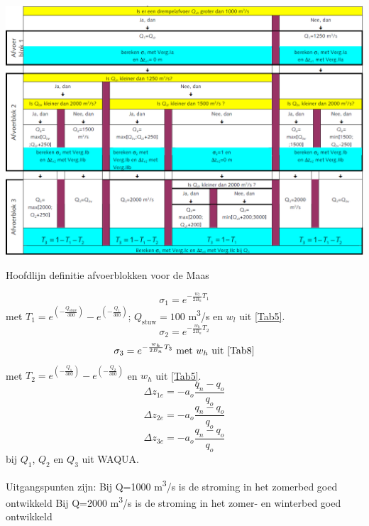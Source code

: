 \begin{table}
\includegraphics[width=\columnwidth]{figures/Tab8.png}
\caption{Hoofdlijn definitie afvoerblokken voor de Maas}
\label{Tab8}
\end{table}
%
\begin{equation}
\sigma_1 = e^{-\frac{w_l}{2 B_n} T_1}
\end{equation}
met $T_1 = e^{\left ( - \frac{Q_\text{stuw}}{300} \right )} - e^{\left ( - \frac{Q_1}{300} \right )}$; $Q_\text{stuw} = 100$ m\textsuperscript{3}/s en $w_l$ uit \autoref{Tab5}.
%
\begin{equation}
\sigma_2 = e^{-\frac{w_h}{2 B_n} T_2}
\end{equation}
%
\begin{equation}
\sigma_3 = e^{-\frac{w_h}{2 B_n} T_3} \text{ met $w_h$ uit \autoref{Tab8}}
\end{equation}
 met $T_2 = e^{\left ( - \frac{Q_1}{300} \right )} - e^{\left ( - \frac{Q_2}{300} \right )}$ en $w_h$ uit \autoref{Tab5}.
%
\begin{equation}
\Delta z_{1e} = -a_o \frac{q_n - q_o}{q_o}
\end{equation}
%
\begin{equation}
\Delta z_{2e} = -a_o \frac{q_n - q_o}{q_o}
\end{equation}
%
\begin{equation}
\Delta z_{3e} = -a_o \frac{q_n - q_o}{q_o}
\end{equation}
bij $Q_1$, $Q_2$ en $Q_3$ uit WAQUA.

Uitgangspunten zijn:
Bij Q=1000 m\textsuperscript{3}/s is de stroming in het zomerbed goed ontwikkeld
Bij Q=2000 m\textsuperscript{3}/s is de stroming in het zomer- en winterbed goed ontwikkeld

